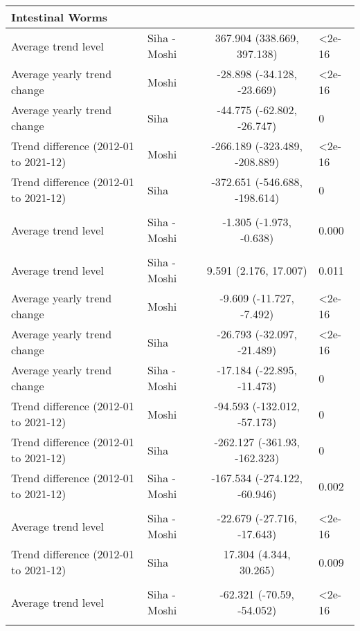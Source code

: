 \begin{longtable}{l|lcl}
\multicolumn{4}{l}{Intestinal Worms} \\ 
\midrule\addlinespace[2.5pt]
Average trend level & Siha - Moshi & 367.904 (338.669, 397.138) & <2e-16 \\ 
Average yearly trend change & Moshi & -28.898 (-34.128, -23.669) & <2e-16 \\ 
Average yearly trend change & Siha & -44.775 (-62.802, -26.747) & 0 \\ 
Trend difference (2012-01 to 2021-12) & Moshi & -266.189 (-323.489, -208.889) & <2e-16 \\ 
Trend difference (2012-01 to 2021-12) & Siha & -372.651 (-546.688, -198.614) & 0 \\ 
\midrule\addlinespace[2.5pt]
\multicolumn{4}{l}{Leprosy} \\ 
\midrule\addlinespace[2.5pt]
Average trend level & Siha - Moshi & -1.305 (-1.973, -0.638) & 0.000 \\ 
\midrule\addlinespace[2.5pt]
\multicolumn{4}{l}{Malaria} \\ 
\midrule\addlinespace[2.5pt]
Average trend level & Siha - Moshi & 9.591 (2.176, 17.007) & 0.011 \\ 
Average yearly trend change & Moshi & -9.609 (-11.727, -7.492) & <2e-16 \\ 
Average yearly trend change & Siha & -26.793 (-32.097, -21.489) & <2e-16 \\ 
Average yearly trend change & Siha - Moshi & -17.184 (-22.895, -11.473) & 0 \\ 
Trend difference (2012-01 to 2021-12) & Moshi & -94.593 (-132.012, -57.173) & 0 \\ 
Trend difference (2012-01 to 2021-12) & Siha & -262.127 (-361.93, -162.323) & 0 \\ 
Trend difference (2012-01 to 2021-12) & Siha - Moshi & -167.534 (-274.122, -60.946) & 0.002 \\ 
\midrule\addlinespace[2.5pt]
\multicolumn{4}{l}{Neuroses} \\ 
\midrule\addlinespace[2.5pt]
Average trend level & Siha - Moshi & -22.679 (-27.716, -17.643) & <2e-16 \\ 
Trend difference (2012-01 to 2021-12) & Siha & 17.304 (4.344, 30.265) & 0.009 \\ 
\midrule\addlinespace[2.5pt]
\multicolumn{4}{l}{Other Cardiovascular Diseases} \\ 
\midrule\addlinespace[2.5pt]
Average trend level & Siha - Moshi & -62.321 (-70.59, -54.052) & <2e-16 \\ 
\midrule\addlinespace[2.5pt]

\end{longtable}
